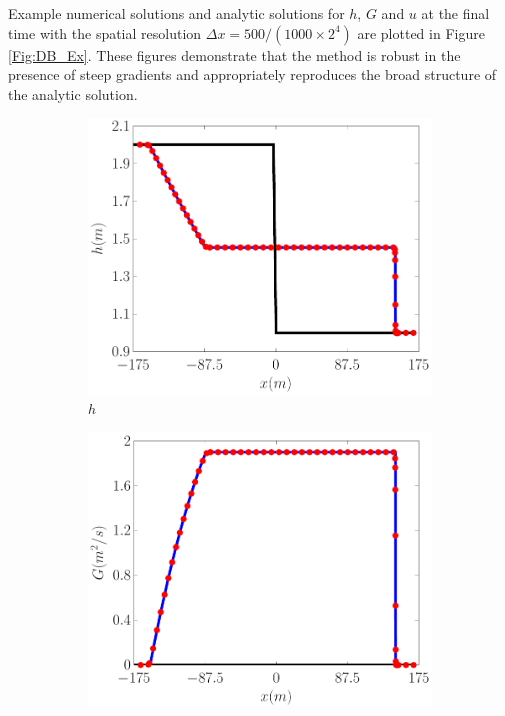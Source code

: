\documentclass[10pt]{elsarticle}
\begin{document}
Example numerical solutions and analytic solutions for $h$, $G$ and $u$ at the final time with the spatial resolution $\Delta x = 500 / (1000 \times 2^{4})$ are plotted in Figure \ref{Fig:DB_Ex}. These figures demonstrate that the method is robust in the presence of steep gradients and appropriately reproduces the broad structure of the analytic solution. 
%
\begin{figure}
	\centering
	\begin{subfigure}{0.32\textwidth}
		\centering
		\includegraphics[width=\textwidth]{./Figures/Simulations/Validation/DBSWWE/hEx.pdf}
		\caption{$h$}
	\end{subfigure}
	\begin{subfigure}{0.32\textwidth}
		\centering
		\includegraphics[width=\textwidth]{./Figures/Simulations/Validation/DBSWWE/GEx.pdf}

\end{subfigure}
\end{figure}
\end{document}
